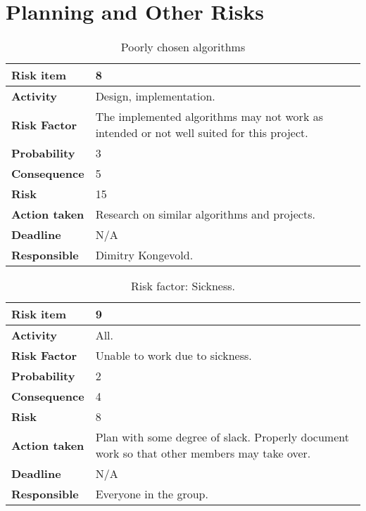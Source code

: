 \section{Planning and Other Risks}

\begin{table}[htdp]

\begin{center}
\begin{tabularx}{\textwidth}{| X | X |}
\hline
\textbf{Risk item} & 8 \\
\hline
\textbf{Activity} & Design, implementation.  \\
\hline
\textbf{Risk Factor} & The implemented algorithms may not work as intended or not well suited for this project.\\
\hline
\textbf{Probability} & 3 \\
\hline
\textbf{Consequence} & 5 \\
\hline
\textbf{Risk} & 15 \\
\hline
\textbf{Action taken} & Research on similar algorithms and projects. \\
\hline
\textbf{Deadline} & N/A \\
\hline
\textbf{Responsible} & Dimitry Kongevold. \\
\hline
\end{tabularx}
\caption{Poorly chosen algorithms}
\end{center}
\label{risk_2}
\end{table}




\begin{table}[htdp]
\begin{center}
\begin{tabularx}{\textwidth}{| X | X |}
\hline
\textbf{Risk item} & 9 \\
\hline
\textbf{Activity} & All. \\
\hline
\textbf{Risk Factor} & Unable to work due to sickness. \\
\hline
\textbf{Probability} & 2 \\
\hline
\textbf{Consequence} & 4 \\
\hline
\textbf{Risk} & 8 \\
\hline
\textbf{Action taken} & Plan with some degree of slack. \newline Properly document work so that other members may take over. \\
\hline
\textbf{Deadline} & N/A \\
\hline
\textbf{Responsible} & Everyone in the group.\\
\hline
\end{tabularx}
\caption{Risk factor: Sickness.}
\end{center}
\label{risk_6}
\end{table}

